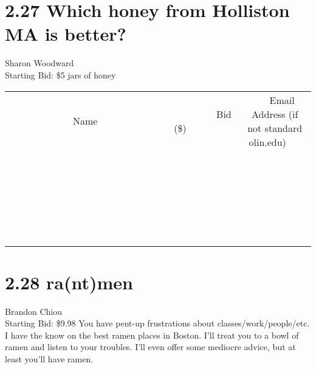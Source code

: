 \documentclass[11pt]{article}
\begin{document}
\section*{2.27 Which honey from Holliston MA is better?}
Sharon Woodward
\\
Starting Bid: \$5
 jars of honey
\\[6ex]
\begin{tabular}{c c c}
~~~~~~~~~~~~~Name~~~~~~~~~~~~~ & ~~~~~~~~~Bid (\$)~~~~~~~~~  & ~~~Email Address (if not standard olin.edu)~~~\\
 & & \\
\hline
 & & \\
\hline
 & & \\
\hline
 & & \\
\hline
 & & \\
\hline
 & & \\
\hline
 & & \\
\hline
 & & \\
\hline
 & & \\
\hline
 & & \\
\hline
 & & \\
\hline
 & & \\
\hline
 & & \\
\hline
 & & \\
\hline
 & & \\
\hline
 & & \\
\hline
 & & \\
\hline
 & & \\
\hline
 & & \\
\hline
 & & \\
\hline
 & & \\
\hline
 & & \\
\hline
 & & \\
\hline
 & & \\
\hline
 & & \\
\hline
 & & \\
\hline
\end{tabular}
\newpage
\section*{2.28 ra(nt)men}
Brandon Chiou
\\
Starting Bid: \$9.98
\newline
You have pent-up frustrations about classes/work/people/etc. I have the know on the best ramen places in Boston. I'll treat you to a bowl of ramen and listen to your troubles. I'll even offer some mediocre advice, but at least you'll have ramen.
\end{document}
